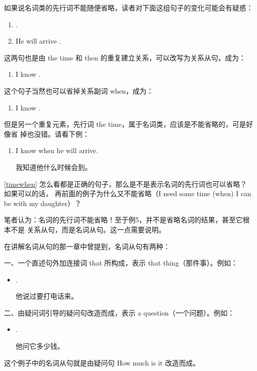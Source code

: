 如果说名词类的先行词不能随便省略，读者对下面这组句子的变化可能会有疑惑：
\begin{enumerate}
\item {}  .
\item He will arrive .
\end{enumerate}
这两句也是由 the time 和 then 的重复建立关系，可以改写为关系从句，成为：
\begin{enumerate}[resume]
\item I know  .
\end{enumerate}
这个句子当然也可以省掉关系副词 when，成为：
\begin{enumerate}[resume]
\item I know  .
\end{enumerate}
但是另一个重复元素，先行词 the time，属于名词类，应该是不能省略的，可是好像省
掉也没错。请看下例：
\begin{enumerate}[resume]
\item\label{timewhen} I know when he will arrive.

  我知道他什么时候会到。
\end{enumerate}

\ref{timewhen} 怎么看都是正确的句子，那么是不是表示名词的先行词也可以省略？如果可以的话，
再前面的例子为什么又不能省略（I need some time (when) I can be with my
daughter）？

笔者认为：名词的先行词不能省略！至于例5，并不是省略名词的结果，甚至它根本不是
关系从句，而是名词从句。这一点需要说明。

在讲解名词从句的那一章中曾提到，名词从句有两种：

一、一个直述句外加连接词 that 所构成，表示 that thing（那件事）。例如：
\begin{itemize}
\item {}  .

  他说过要打电话来。
\end{itemize}

二、由疑问词引导的疑问句改造而成，表示 a question（一个问题）。例如：
\begin{itemize}
\item {}  .

  他问它多少钱。
\end{itemize}
这个例子中的名词从句就是由疑问句 How much is it 改造而成。

